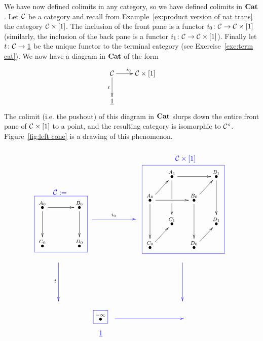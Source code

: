 \documentclass[CT4S-EN-RU]{subfiles}
\begin{document}
\begin{exampleENG}
We have now defined colimits in any category, so we have defined colimits in ${\mathbf{Cat}}$. Let $\mathcal{C}$ be a category and recall from Example~\ref{ex:product version of nat trans} the category $\mathcal{C}\times[1]$. The inclusion of the front pane is a functor $i_0\colon\mathcal{C}\rightarrow\mathcal{C}\times[1]$ (similarly, the inclusion of the back pane is a functor $i_1\colon\mathcal{C}\rightarrow\mathcal{C}\times[1]$). Finally let $t\colon\mathcal{C}\rightarrow\underline{1}$ be the unique functor to the terminal category (see Exercise~\ref{exc:term cat}). We now have a diagram in ${\mathbf{Cat}}$ of the form 
$$\xymatrix{\mcC\ar[r]^{i_0}\ar[d]_{t}&\mcC\times[1]\\\ul{1}}$$
The colimit (i.e. the pushout) of this diagram in ${\mathbf{Cat}}$ slurps down the entire front pane of $\mathcal{C}\times[1]$ to a point, and the resulting category is isomorphic to $\mathcal{C}^\triangleleft$. Figure~\ref{fig:left cone} is a drawing of this phenomenon.
\begin{figure}[H]
$$
\parbox{1in}{~\vspace{.6in}\boxtitle{\color{blue}{$\mcC:=$}}\cfbox{blue}{\parbox{.7in}{\xymatrix@=15pt{
\LMO{A_0}\ar[rr]\ar[dd]&&\LMO{B_0}\ar[dd]\\\\\LMO{C_0}&&\LMO{D_0}
}}}}
\parbox{1.1in}{~\vspace{.6in}\\\xymatrix{~\ar@[blue][rr]^{i_0}&\hspace{.1in}&~}}
\parbox{1.7in}{\boxtitle{\color{blue}{$\mcC\times[1]$}}\cfbox{blue}{\parbox{1.4in}{\xymatrix@=15pt{
&\LMO{A_1}\ar[rr]\ar'[d][dd]&&\LMO{B_1}\ar[dd]\\
\LMO{A_0}\ar[ur]\ar[rr]\ar[dd]&&\LMO{B_0}\ar[ur]\ar[dd]\\
&\LMO{C_1}&&\LMO{D_1}\\
\LMO{C_0}\ar[ur]&&\LMO{D_0}\ar[ur]&
}}}}
$$
$$
\hspace{-.5in}\xymatrix{~\ar@[blue][dd]_t\\\\~}\hspace{2.3in}\xymatrix{~\ar@[blue][dd]\\\\~}
$$
$$
\hspace{.4in}\parbox{.3in}{\cfbox{blue}{$\LMO{-\infty}$}\begin{center}\color{blue}{$\ul{1}$}\end{center}}
\parbox{1.6in}{\xymatrix{~\ar@[blue][rr]&\hspace{.6in}&~}\vspace{.15in}~}
$$
\end{figure}
\end{exampleENG}
\end{document}
